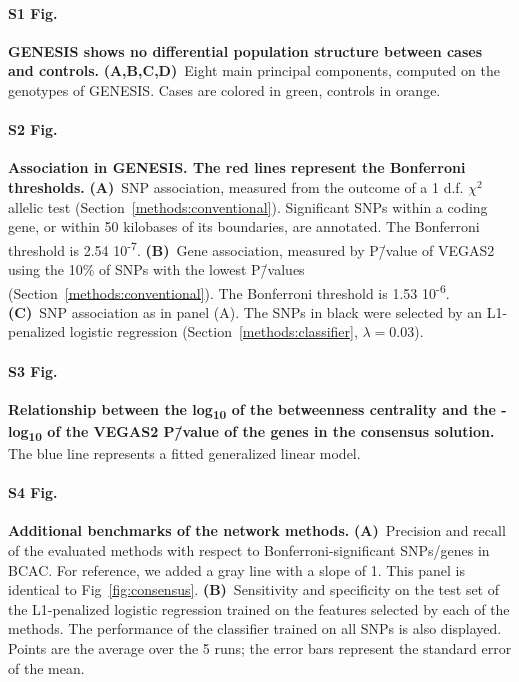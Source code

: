 \documentclass[10pt,letterpaper]{article}
\begin{document}
\paragraph*{S1 Fig.}
\label{sfig:pcs}
\textbf{GENESIS shows no differential population structure between cases and controls.} \textbf{(A,B,C,D)}~Eight main principal components, computed on the genotypes of GENESIS. Cases are colored in green, controls in orange.

\paragraph*{S2 Fig.}
\label{sfig:snp_gene_manhattan}
\textbf{Association in GENESIS. The red lines represent the Bonferroni thresholds.} \textbf{(A)}~SNP association, measured from the outcome of a 1 d.f. $\chi^2$ allelic test (Section~\ref{methods:conventional}). Significant SNPs within a coding gene, or within 50 kilobases of its boundaries, are annotated. The Bonferroni threshold is 2.54 \texttimes{} 10\textsuperscript{-7}. \textbf{(B)}~Gene association, measured by P\=/value of VEGAS2 \cite{mishra_vegas2:_2015} using the 10\% of SNPs with the lowest P\=/values (Section~\ref{methods:conventional}). The Bonferroni threshold is 1.53 \texttimes{} 10\textsuperscript{-6}. \textbf{(C)}~SNP association as in panel (A). The SNPs in black were selected by an L1-penalized logistic regression (Section~\ref{methods:classifier}, $\lambda = 0.03$).

\paragraph*{S3 Fig.}
\label{sfig:consensus_stats}
\textbf{Relationship between the log\textsubscript{10} of the betweenness centrality and the -log\textsubscript{10} of the VEGAS2 P\=/value of the genes in the consensus solution.} The blue line represents a fitted generalized linear model.
  
\paragraph*{S4 Fig.}
\label{sfig:additional-benchmarks}
\textbf{Additional benchmarks of the network methods.} \textbf{(A)}~Precision and recall of the evaluated methods with respect to Bonferroni-significant SNPs/genes in BCAC. For reference, we added a gray line with a slope of 1. This panel is identical to Fig~\ref{fig:consensus}. \textbf{(B)}~Sensitivity and specificity on the test set of the L1-penalized logistic regression trained on the features selected by each of the methods. The performance of the classifier trained on all SNPs is also displayed. Points are the average over the 5 runs; the error bars represent the standard error of the mean.
\end{document}
